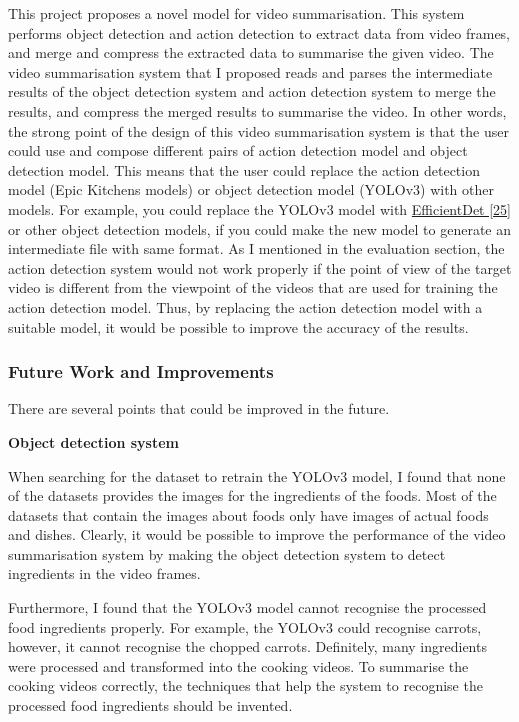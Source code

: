 \documentclass{article}
\begin{document}
This project proposes a novel model for video summarisation. This system performs object detection and action detection to extract data from video frames, and merge and compress the extracted data to summarise the given video. The video summarisation system that I proposed reads and parses the intermediate results of the object detection system and action detection system to merge the results, and compress the merged results to summarise the video. In other words, the strong point of the design of this video summarisation system is that the user could use and compose different pairs of action detection model and object detection model. This means that the user could replace the action detection model (Epic Kitchens models) or object detection model (YOLOv3) with other models. For example, you could replace the YOLOv3 model with \hyperlink{ref8}{EfficientDet [25]} or other object detection models, if you could make the new model to generate an intermediate file with same format. As I mentioned in the evaluation section, the action detection system would not work properly if the point of view of the target video is different from the viewpoint of the videos that are used for training the action detection model. Thus, by replacing the action detection model with a suitable model, it would be possible to improve the accuracy of the results.

\subsubsection{Future Work and Improvements}

There are several points that could be improved in the future.\newline

\textbf{Object detection system}

When searching for the dataset to retrain the YOLOv3 model, I found that none of the datasets provides the images for the ingredients of the foods. Most of the datasets that contain the images about foods only have images of actual foods and dishes. Clearly, it would be possible to improve the performance of the video summarisation system by making the object detection system to detect ingredients in the video frames.

Furthermore, I found that the YOLOv3 model cannot recognise the processed food ingredients properly. For example, the YOLOv3 could recognise carrots, however, it cannot recognise the chopped carrots. Definitely, many ingredients were processed and transformed into the cooking videos. To summarise the cooking videos correctly, the techniques that help the system to recognise the processed food ingredients should be invented.\newline
\end{document}
